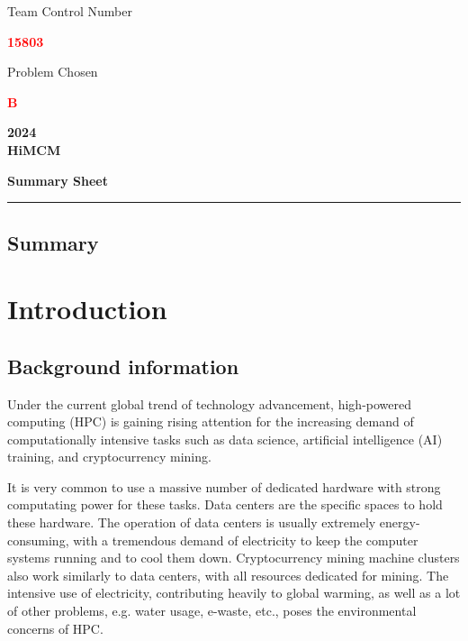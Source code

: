\documentclass[12pt]{article}
\newcommand{\identifierRedFont}[1]{{\huge \textbf{\textcolor{red}{#1}}}}
\begin{document}
\thispagestyle{empty}

\begin{center}
	Team Control Number
	
	\identifierRedFont{15803}

	Problem Chosen
	
	\identifierRedFont{B}

	\textbf{\large 2024} \\
	\textbf{HiMCM}

	\textbf{\small Summary Sheet}
\end{center}

\noindent\rule{\textwidth}{1pt}

\begin{center}
	\section*{Summary}
\end{center}

\newpage

{\center\tableofcontents}

\newpage

\section{Introduction}

\subsection{Background information}

Under the current global trend of technology advancement, high-powered computing (HPC) is gaining rising attention for the increasing demand of computationally intensive tasks such as data science, artificial intelligence (AI) training, and cryptocurrency mining.

It is very common to use a massive number of dedicated hardware with strong computating power for these tasks. Data centers are the specific spaces to hold these hardware. The operation of data centers is usually extremely energy-consuming, with a tremendous demand of electricity to keep the computer systems running and to cool them down. Cryptocurrency mining machine clusters also work similarly to data centers, with all resources dedicated for mining. The intensive use of electricity, contributing heavily to global warming, as well as a lot of other problems, e.g. water usage, e-waste, etc., poses the environmental concerns of HPC.
\end{document}
